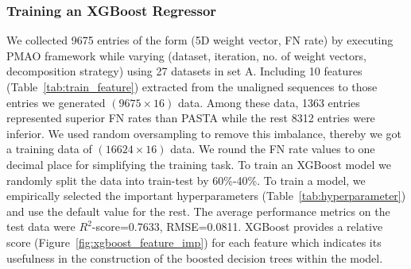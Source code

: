 \graphicspath{{pmao/supp/Figure/}}
\subsubsection{Training an XGBoost Regressor} \label{appendix:train_xgboost}
We collected 9675 entries of the form (5D weight vector, FN rate) by executing PMAO framework while varying (dataset, iteration, no. of weight vectors, decomposition strategy) using 27 datasets in set A. Including 10 features (Table~\ref{tab:train_feature}) extracted from the unaligned sequences to those entries we generated $(9675 \times 16)$ data. Among these data, 1363 entries represented superior FN rates than PASTA while the rest 8312 entries were inferior. We used random oversampling to remove this imbalance, thereby we got a training data of $(16624 \times 16)$ data. We round the FN rate values to one decimal place for simplifying the training task. To train an XGBoost model we randomly split the data into train-test by 60\%-40\%. To train a model, we empirically selected the important hyperparameters (Table~\ref{tab:hyperparameter}) and use the default value for the rest. The average performance metrics on the test data were $R^2$-score=0.7633, RMSE=0.0811. XGBoost provides a relative score (Figure~\ref{fig:xgboost_feature_imp}) for each feature which
indicates its usefulness in the construction
of the boosted decision trees within the model.


